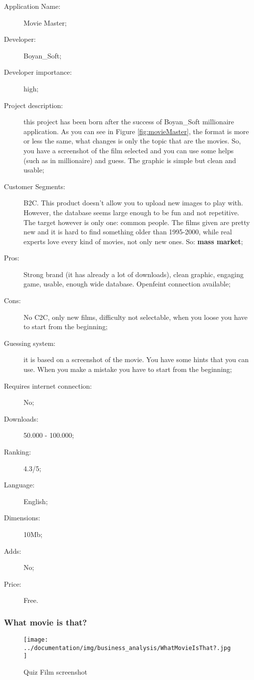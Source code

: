 \begin{description}
\item[Application Name:] Movie Master;
\item[Developer:] Boyan\_Soft;
\item[Developer importance:] high;
\item[Project description:] this project has been born after the success of Boyan\_Soft millionaire application. As you can see in Figure \ref{fig:movieMaster}, the format is more or less the same, what changes is only the topic that are the movies. So, you have a screenshot of the film selected and you can use some helps (such as in millionaire) and guess. The graphic is simple but clean and usable;
\item[Customer Segments:] B2C. This product doesn't allow you to upload new images to play with. However, the database seems large enough to be fun and not repetitive. The target however is only one: common people. The films given are pretty new and it is hard to find something older than 1995-2000, while real experts love every kind of movies, not only new ones. So: \textbf{mass market};
\item[Pros:] Strong brand (it has already a lot of downloads), clean graphic, engaging game, usable, enough wide database. Openfeint connection available;
\item[Cons:] No C2C, only new films, difficulty not selectable, when you loose you have to start from the beginning;
\item[Guessing system:] it is based on a screenshot of the movie. You have some hints that you can use. When you make a mistake you have to start from the beginning;
\item[Requires internet connection:] No;
\item[Downloads:] 50.000 - 100.000;
\item[Ranking:] 4.3/5;
\item[Language:] English;
\item[Dimensions:] 10Mb;
\item[Adds:] No;
\item[Price:] Free.
\end{description}

\subsubsection{What movie is that?}

\begin{figure}[H]
\centering %
\texttt{[image: ../documentation/img/business\_analysis/WhatMovieIsThat?.jpg]}
\caption{Quiz Film screenshot}
\label{fig:whatMovieIsThat}
\end{figure}

